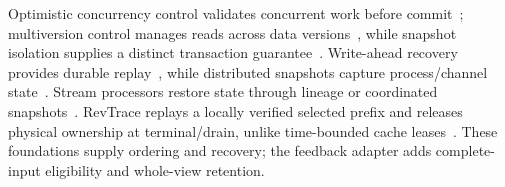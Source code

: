 Optimistic concurrency control validates concurrent work before
commit~\cite{kung1981occ}; multiversion control manages reads across data
versions~\cite{bernstein1983mvcc}, while snapshot isolation supplies a
distinct transaction guarantee~\cite{berenson1995isolation}.
Write-ahead recovery provides durable replay~\cite{mohan1992aries}, while
distributed snapshots capture process/channel state~\cite{chandy1985snapshots}.
Stream processors restore state through lineage or coordinated
snapshots~\cite{zaharia2013dstreams,carbone2017flinkstate}. RevTrace replays
a locally verified selected prefix and releases physical ownership at
terminal/drain, unlike time-bounded cache leases~\cite{gray1989leases}.
These foundations supply ordering and recovery; the feedback adapter adds
complete-input eligibility and whole-view retention.
